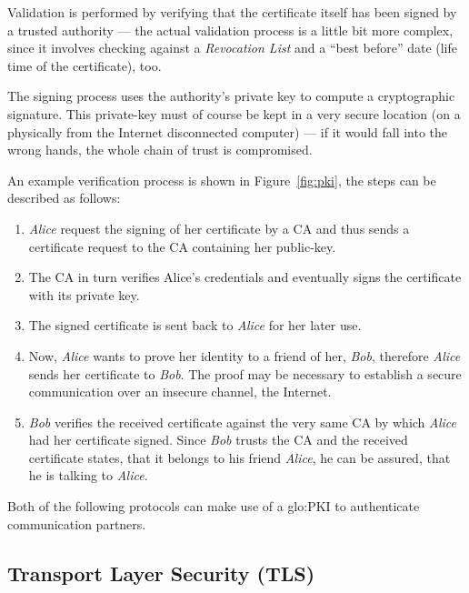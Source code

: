 Validation is performed by verifying  that the certificate itself has been
signed  by a  trusted authority  --- the  actual validation  process  is a
little   bit  more  complex,   since  it   involves  checking   against  a
\emph{Revocation List} and  a ``best before'' date (\ie life  time of the
certificate), too.

The  signing  process  uses  the  authority's private  key  to  compute  a
cryptographic signature. This private-key must of course be kept in a very
secure  location  (\eg on a  physically  from  the Internet  disconnected
computer) ---  if it would fall into  the wrong hands, the  whole chain of
trust is compromised.

An  example verification  process  is shown  in Figure~\ref{fig:pki},  the
steps can be described as follows:
\begin{enumerate}
\item \emph{Alice} request the signing of her certificate by a CA and thus
  sends a certificate request to the CA containing her public-key.
\item The CA in turn verifies Alice's credentials and eventually signs the
  certificate with its private key.
\item The signed certificate is sent back to \emph{Alice} for her later use.
\item Now,  \emph{Alice} wants to prove  her identity to a  friend of her,
  \emph{Bob},   therefore   \emph{Alice}    sends   her   certificate   to
  \emph{Bob}.  The   proof  may  be   necessary  to  establish   a  secure
  communication over an insecure channel, \eg the Internet.
\item \emph{Bob}  verifies the received certificate against  the very same
  CA by  which \emph{Alice} had her certificate  signed.  Since \emph{Bob}
  trusts the  CA and the received  certificate states, that  it belongs to
  his  friend \emph{Alice},  he  can be  assured,  that he  is talking  to
  \emph{Alice}.
\end{enumerate}

\bigskip

Both  of  the following  protocols  can make  use  of  a \gls{glo:PKI}  to
authenticate communication partners.

\subsection[Transport Layer Security]{Transport Layer Security (TLS)}
\label{sec:fundamentals:tls}

